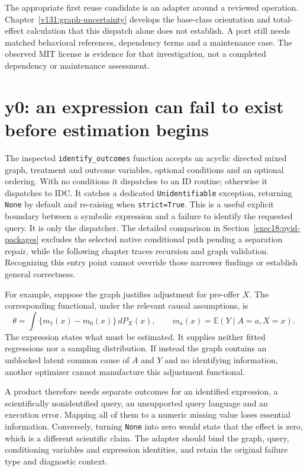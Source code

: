 The appropriate first reuse candidate is an adapter around a reviewed operation.
Chapter~\ref{v131:graph-uncertainty} develops the base-class orientation and
total-effect calculation that this dispatch alone does not establish. A port
still needs matched behavioral references, dependency terms and a maintenance
case. The observed MIT license is evidence for that investigation, not a
completed dependency or maintenance assessment. \cite{v13_sw_lingam}

\section{y0: an expression can fail to exist before estimation begins}

The inspected \texttt{identify\_outcomes} function accepts an acyclic directed
mixed graph, treatment and outcome variables, optional conditions and an optional
ordering. With no conditions it dispatches to an ID routine; otherwise it
dispatches to IDC. It catches a dedicated \texttt{Unidentifiable} exception,
returning \texttt{None} by default and re-raising when \texttt{strict=True}.
This is a useful explicit boundary between a symbolic expression and a failure
to identify the requested query. It is only the dispatcher. The detailed
comparison in Section~\ref{exec18:pyid-packages} excludes the selected native
conditional path pending a separation repair, while the following chapter
traces recursion and graph validation. Recognizing this entry point cannot
override those narrower findings or establish general correctness. \cite{v13_sw_y0}

For example, suppose the graph justifies adjustment for pre-offer $X$. The
corresponding functional, under the relevant causal assumptions, is
\[
 \theta=\int\{m_1(x)-m_0(x)\}\,dP_X(x),
 \qquad m_a(x)=\mathbb E(Y\mid A=a,X=x).
\]
The expression states what must be estimated. It supplies neither fitted
regressions nor a sampling distribution. If instead the graph contains an
unblocked latent common cause of $A$ and $Y$ and no identifying information,
another optimizer cannot manufacture this adjustment functional.

A product therefore needs separate outcomes for an identified expression, a
scientifically nonidentified query, an unsupported query language and an
execution error. Mapping all of them to a numeric missing value loses essential
information. Conversely, turning \texttt{None} into zero would state that the
effect is zero, which is a different scientific claim. The adapter should bind
the graph, query, conditioning variables and expression identities, and retain
the original failure type and diagnostic context.

